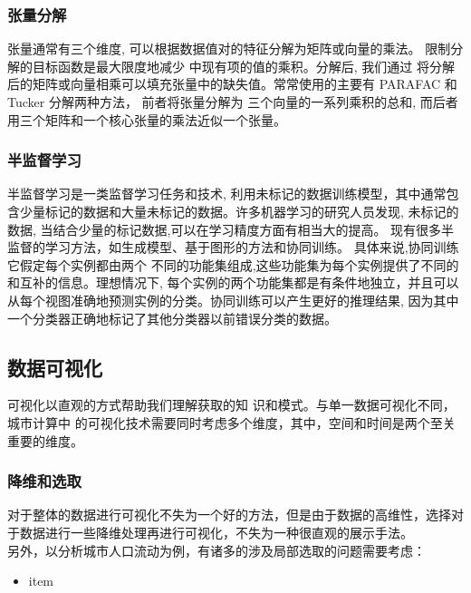 \subsubsection*{张量分解}
张量通常有三个维度, 可以根据数据值对的特征分解为矩阵或向量的乘法。 限制分解的目标函数是最大限度地减少
中现有项的值的乘积。分解后, 我们通过
将分解后的矩阵或向量相乘可以填充张量中的缺失值。常常使用的主要有 PARAFAC\cite{bro1997parafac} 和 Tucker 分解\cite{kolda2009tensor}两种方法， 前者将张量分解为
三个向量的一系列乘积的总和, 而后者
用三个矩阵和一个核心张量的乘法近似一个张量。
\subsubsection*{半监督学习
}
半监督学习是一类监督学习任务和技术, 利用未标记的数据训练模型，其中通常包含少量标记的数据和大量未标记的数据。许多机器学习的研究人员发现, 未标记的数据, 当结合少量的标记数据,可以在学习精度方面有相当大的提高。 现有很多半监督的学习方法，如生成模型、基于图形的方法和协同训练。 具体来说,协同训练它假定每个实例都由两个
不同的功能集组成,这些功能集为每个实例提供了不同的和互补的信息。理想情况下, 每个实例的两个功能集都是有条件地独立，并且可以从每个视图准确地预测实例的分类。协同训练可以产生更好的推理结果, 因为其中一个分类器正确地标记了其他分类器以前错误分类的数据\cite{nigam2000analyzing}。\\

\subsection{数据可视化}
可视化以直观的方式帮助我们理解获取的知
识和模式。与单一数据可视化不同，城市计算中
的可视化技术需要同时考虑多个维度，其中，空间和时间是两个至关重要的维度\cite{zhengyu2015}。
\subsubsection*{降维和选取}
对于整体的数据进行可视化不失为一个好的方法，但是由于数据的高维性，选择对于数据进行一些降维处理再进行可视化，不失为一种很直观的展示手法。\\
另外，以分析城市人口流动为例，有诸多的涉及局部选取的问题需要考虑：
\begin{itemize}
	\item item
\end{itemize}